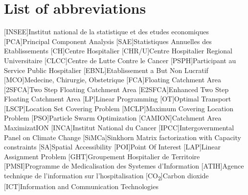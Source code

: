 \chapter*{List of abbreviations}



\begin{multicols}{2}

\begin{acronym}
        [INSEE]{Institut national de la statistique et des etudes economiques}
        [PCA]{Principal Component Analysis}
        [SAE]{Statistiques Annuelles des Etablissements}
        [CH]{Centre Hospitalier}
        [CHR/U]{Centre Hospitalier Regional \/ Universitaire}
        [CLCC]{Centre de Lutte Contre le Cancer}
        [PSPH]{Participant au Service Public Hospitalier }
        [EBNL]{Etablissement a But Non Lucratif}
        [MCO]{Medecine, Chirurgie, Obstetrique}
        [FCA]{Floating Catchment Area}
        [2SFCA]{Two Step Floating Catchment Area}
        [E2SFCA]{Enhanced Two Step Floating Catchment Area}
        [LP]{Linear Programming}
        [OT]{Optimal Transport}
        [LSCP]{Location Set Covering Problem}
        [MCLP]{Maximum Covering Location Problem}
        [PSO]{Particle Swarm Optimization}
        [CAMION]{Catchment Area MaximizatION}
        [INCA]{Institut National du Cancer}
        [IPCC]{Intergovernmental Panel on Climate Change}
        [SiMCa]{Sinkhorn Matrix factorization with Capacity constraints}
        [SA]{Spatial Accessibility}
        [POI]{Point Of Interest}
        [LAP]{Linear Assignment Problem}
        [GHT]{Groupement Hospitalier de Territoire}
        [PMSI]{Programme de Medicalisation des Systemes d'Information}
        [ATIH]{Agence technique de l'information sur l'hospitalisation}
        [CO\textsubscript{2}]{Carbon dioxide}
        [ICT]{Information and Communication Technologies}
\end{acronym}

\end{multicols}
